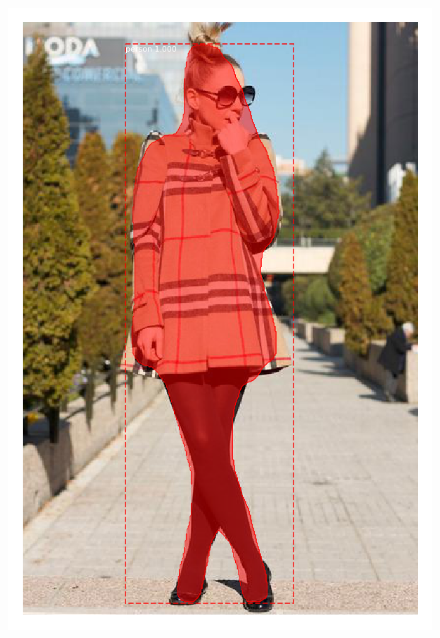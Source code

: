 \documentclass[12pt]{report}
\begin{document}
\begin{figure}
\begin{minipage}[b]{0.3\textwidth}
    \includegraphics[width=\textwidth]{images/resultados/299206person.png}

\end{minipage}
\end{figure}
\end{document}
